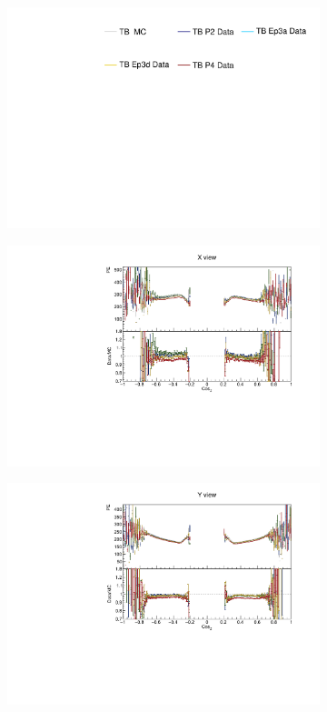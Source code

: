 \begin{figure}[!ht]
  \begin{subfigure}{\textwidth}
    \centering
    \includegraphics[height=0.2\linewidth]{essentialsec_tb/legend.pdf}
  \end{subfigure}
  \vspace*{2mm}
  
  \begin{subfigure}{0.5\textwidth}
    \includegraphics[width=\linewidth]{PlotsAngularDistribution/pe_cosz_x.pdf}
  \end{subfigure}
  \begin{subfigure}{0.495\textwidth}
    \includegraphics[width=\linewidth]{PlotsAngularDistribution/pe_cosz_y.pdf}

\end{subfigure}
\end{figure}
